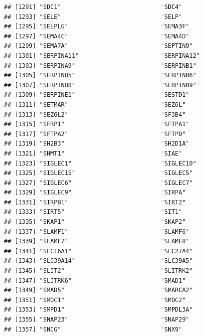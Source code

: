\documentclass[
]{article}
\begin{document}
\begin{verbatim}
## [1291] "SDC1"                            "SDC4"                           
## [1293] "SELE"                            "SELP"                           
## [1295] "SELPLG"                          "SEMA3F"                         
## [1297] "SEMA4C"                          "SEMA4D"                         
## [1299] "SEMA7A"                          "SEPTIN9"                        
## [1301] "SERPINA11"                       "SERPINA12"                      
## [1303] "SERPINA9"                        "SERPINB1"                       
## [1305] "SERPINB5"                        "SERPINB6"                       
## [1307] "SERPINB8"                        "SERPINB9"                       
## [1309] "SERPINE1"                        "SESTD1"                         
## [1311] "SETMAR"                          "SEZ6L"                          
## [1313] "SEZ6L2"                          "SF3B4"                          
## [1315] "SFRP1"                           "SFTPA1"                         
## [1317] "SFTPA2"                          "SFTPD"                          
## [1319] "SH2B3"                           "SH2D1A"                         
## [1321] "SHMT1"                           "SIAE"                           
## [1323] "SIGLEC1"                         "SIGLEC10"                       
## [1325] "SIGLEC15"                        "SIGLEC5"                        
## [1327] "SIGLEC6"                         "SIGLEC7"                        
## [1329] "SIGLEC9"                         "SIRPA"                          
## [1331] "SIRPB1"                          "SIRT2"                          
## [1333] "SIRT5"                           "SIT1"                           
## [1335] "SKAP1"                           "SKAP2"                          
## [1337] "SLAMF1"                          "SLAMF6"                         
## [1339] "SLAMF7"                          "SLAMF8"                         
## [1341] "SLC16A1"                         "SLC27A4"                        
## [1343] "SLC39A14"                        "SLC39A5"                        
## [1345] "SLIT2"                           "SLITRK2"                        
## [1347] "SLITRK6"                         "SMAD1"                          
## [1349] "SMAD5"                           "SMARCA2"                        
## [1351] "SMOC1"                           "SMOC2"                          
## [1353] "SMPD1"                           "SMPDL3A"                        
## [1355] "SNAP23"                          "SNAP29"                         
## [1357] "SNCG"                            "SNX9"                           

\end{verbatim}
\end{document}
